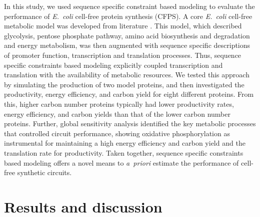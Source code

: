 \documentclass[journal=asbcd6,manuscript=article]{achemso}
\begin{document}
In this study, we used sequence specific constraint based modeling to evaluate the performance of \emph{E.~coli} cell-free protein synthesis (CFPS).
A core \emph{E.~coli} cell-free metabolic model was developed from literature \cite{Feist:2007aa}.
This model, which described glycolysis, pentose phosphate pathway, amino acid biosynthesis and degradation and energy metabolism, was then augmented with
sequence specific descriptions of promoter function, transcription and translation processes.
Thus, sequence specific constraints based modeling explicitly coupled transcription and translation with the availability of metabolic resources.
We tested this approach by simulating the production of two model proteins, and then investigated the productivity, energy efficiency, and carbon yield for eight different proteins.
From this, higher carbon number proteins typically had lower productivity rates, energy efficiency, and carbon yields than that of the lower carbon number proteins.
Further, global sensitivity analysis identified the key metabolic processes that controlled circuit performance, showing oxidative phosphorylation as instrumental for maintaining a high energy efficiency
and carbon yield and the translation rate for productivity.
Taken together, sequence specific constraints based modeling offers a novel means to \emph{a~priori} estimate the performance of cell-free synthetic circuits.

\clearpage

\section{Results and discussion}


\end{document}
